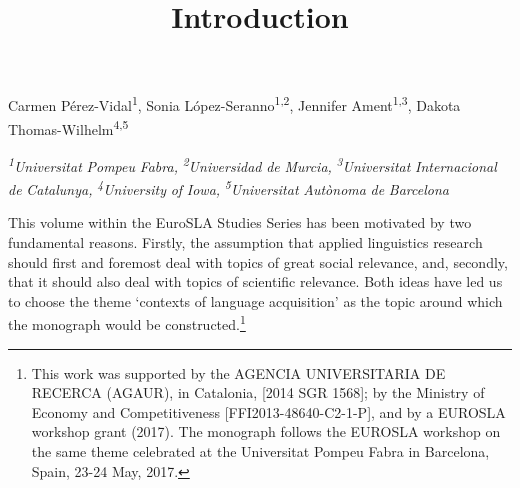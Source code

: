 
\title{Introduction}

Carmen Pérez-Vidal\textsuperscript{1}, Sonia López-Seranno\textsuperscript{1,2}, Jennifer Ament\textsuperscript{1,3}, Dakota Thomas-Wilhelm\textsuperscript{4,5}

\textit{\textsuperscript{1}}\textit{Universitat} \textit{Pompeu} \textit{Fabra,} \textit{\textsuperscript{2}}\textit{Universidad} \textit{de} \textit{Murcia,} \textit{\textsuperscript{3}}\textit{Universitat} \textit{Internacional} \textit{de} \textit{Catalunya,} \textit{\textsuperscript{4}}\textit{University} \textit{of} \textit{Iowa,\textsuperscript{} } \textit{\textsuperscript{5}}\textit{Universitat} \textit{Autònoma} \textit{de} \textit{Barcelona}

This volume within the EuroSLA Studies Series has been motivated by two fundamental reasons. Firstly, the assumption that applied linguistics research should first and foremost deal with topics of great social relevance, and, secondly, that it should also deal with topics of scientific relevance. Both ideas have led us to choose the theme ‘contexts of language acquisition’ as the topic around which the monograph would be constructed.\footnote{This work was supported by the AGENCIA UNIVERSITARIA DE RECERCA (AGAUR), in Catalonia, [2014 SGR 1568]; by the Ministry of Economy and Competitiveness [FFI2013-48640-C2-1-P], and by a EUROSLA workshop grant (2017).   The monograph follows the EUROSLA workshop on the same theme celebrated at the Universitat Pompeu Fabra in Barcelona, Spain, 23-24 May, 2017.}

